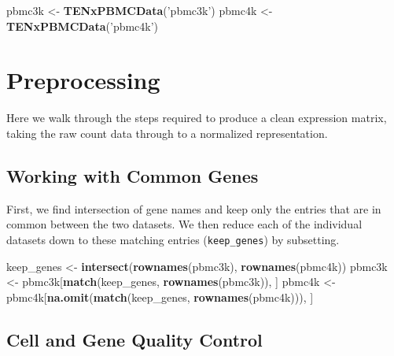\documentclass[]{book}
\newenvironment{Shaded}{\begin{snugshade}}{\end{snugshade}}
\newcommand{\KeywordTok}[1]{\textcolor[rgb]{0.13,0.29,0.53}{\textbf{#1}}}
\newcommand{\NormalTok}[1]{#1}
\newcommand{\StringTok}[1]{\textcolor[rgb]{0.31,0.60,0.02}{#1}}
\begin{document}
\begin{Shaded}
\begin{Highlighting}[]
\NormalTok{pbmc3k <-}\StringTok{ }\KeywordTok{TENxPBMCData}\NormalTok{(}\StringTok{'pbmc3k'}\NormalTok{)}
\NormalTok{pbmc4k <-}\StringTok{ }\KeywordTok{TENxPBMCData}\NormalTok{(}\StringTok{'pbmc4k'}\NormalTok{)}
\end{Highlighting}
\end{Shaded}

\hypertarget{preprocessing-1}{%
\section{Preprocessing}\label{preprocessing-1}}

Here we walk through the steps required to produce a clean expression matrix, taking the raw count data through to a normalized representation.

\hypertarget{working-with-common-genes}{%
\subsection{Working with Common Genes}\label{working-with-common-genes}}

First, we find intersection of gene names and keep only the entries that are in common between the two datasets. We then reduce each of the individual datasets down to these matching entries (\texttt{keep\_genes}) by subsetting.

\begin{Shaded}
\begin{Highlighting}[]
\NormalTok{keep_genes <-}\StringTok{ }\KeywordTok{intersect}\NormalTok{(}\KeywordTok{rownames}\NormalTok{(pbmc3k), }\KeywordTok{rownames}\NormalTok{(pbmc4k))}
\NormalTok{pbmc3k <-}\StringTok{ }\NormalTok{pbmc3k[}\KeywordTok{match}\NormalTok{(keep_genes, }\KeywordTok{rownames}\NormalTok{(pbmc3k)), ]}
\NormalTok{pbmc4k <-}\StringTok{ }\NormalTok{pbmc4k[}\KeywordTok{na.omit}\NormalTok{(}\KeywordTok{match}\NormalTok{(keep_genes, }\KeywordTok{rownames}\NormalTok{(pbmc4k))), ]}
\end{Highlighting}
\end{Shaded}

\hypertarget{cell-and-gene-quality-control}{%
\subsection{Cell and Gene Quality Control}\label{cell-and-gene-quality-control}}
\end{document}
